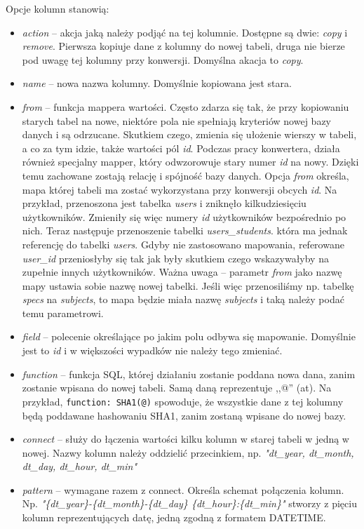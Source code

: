 \documentclass[a4paper,12pt,oneside]{report}
\begin{document}
Opcje kolumn stanowią:
\begin{itemize}
  \item \emph{action} -- akcja jaką należy podjąć na tej kolumnie. Dostępne są dwie: \emph{copy} i \emph{remove}. Pierwsza kopiuje dane z kolumny do nowej tabeli, druga nie bierze pod uwagę tej kolumny przy konwersji. Domyślna akacja to \emph{copy}.
  \item \emph{name} -- nowa nazwa kolumny. Domyślnie kopiowana jest stara.
  \item \emph{from} -- funkcja mappera wartości. Często zdarza się tak, że przy kopiowaniu starych tabel na nowe, niektóre pola nie spełniają kryteriów nowej bazy danych i są odrzucane. Skutkiem czego, zmienia się ułożenie wierszy w tabeli, a co za tym idzie, także wartości pól \emph{id}. Podczas pracy konwertera, działa również specjalny mapper, który odwzorowuje stary numer \emph{id} na nowy. Dzięki temu zachowane zostają relację i spójność bazy danych. Opcja \emph{from} określa, mapa której tabeli ma zostać wykorzystana przy konwersji obcych \emph{id}. Na przykład, przenoszona jest tabelka \emph{users} i zniknęło kilkudziesięciu użytkowników. Zmieniły się więc numery \emph{id} użytkowników bezpośrednio po nich. Teraz następuje przenoszenie tabelki \emph{users\_students}. która ma jednak referencję do tabelki \emph{users}. Gdyby nie zastosowano mapowania, referowane \emph{user\_id} przeniosłyby się tak jak były skutkiem czego wskazywałyby na zupełnie innych użytkowników. Ważna uwaga -- parametr \emph{from} jako nazwę mapy ustawia sobie nazwę nowej tabelki. Jeśli więc przenosiliśmy np. tabelkę \emph{specs} na \emph{subjects}, to mapa będzie miała nazwę \emph{subjects} i taką należy podać temu parametrowi.
  \item \emph{field} -- polecenie określające po jakim polu odbywa się mapowanie. Domyślnie jest to \emph{id} i w większości wypadków nie należy tego zmieniać.
  \item \emph{function} -- funkcja SQL, której działaniu zostanie poddana nowa dana, zanim zostanie wpisana do nowej tabeli. Samą daną reprezentuje ,,@'' (at). Na przykład, \verb+function: SHA1(@)+ spowoduje, że wszystkie dane z tej kolumny będą poddawane hashowaniu SHA1, zanim zostaną wpisane do nowej bazy.
  \item \emph{connect} -- służy do łączenia wartości kilku kolumn w starej tabeli w jedną w nowej. Nazwy kolumn należy oddzielić przecinkiem, np. \emph{"dt\_year, dt\_month, dt\_day, dt\_hour, dt\_min"}
  \item \emph{pattern} -- wymagane razem z connect. Określa schemat połączenia kolumn. Np. \emph{"\{dt\_year\}-\{dt\_month\}-\{dt\_day\} \{dt\_hour\}:\{dt\_min\}"} stworzy z pięciu kolumn reprezentujących datę, jedną zgodną z formatem DATETIME.
\end{itemize}
\end{document}
